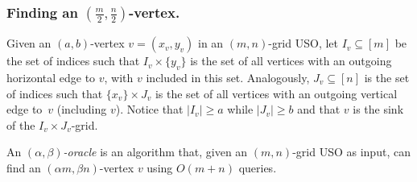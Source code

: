 \documentclass[runningheads,a4paper]{llncs}
\newtheorem{observation}{Observation}
\newcommand{\AT}[1]{\marginpar{\parbox{3.6cm}{{\small {\bf AT:} #1}}}} %
\begin{document}
\vspace{-.2in}\subsubsection{Finding an $(\frac{m}{2}, \frac{n}{2})$-vertex.}

Given an $(a, b)$-vertex $v = (x_v, y_v)$ in an $(m,n)$-grid USO, let $I_v\subseteq [m]$ be the set of indices such that  $I_v \times \{y_v\}$ is the set of all vertices with an outgoing horizontal edge to $v$, with $v$ included in this set. Analogously, $J_v\subseteq [n]$ is the set of indices such that $\{x_v\}\times J_v$ is the set of all vertices with an outgoing vertical edge to~$v$ (including $v$). Notice that $|I_v| \geq a$ while $|J_v| \geq b$ and that $v$ is the sink of the $I_v\times J_v$-grid.



An \emph{$(\alpha, \beta)$-oracle} is an algorithm that, given an $(m, n)$-grid USO as input, can find an $(\alpha m, \beta n)$-vertex $v$ using $O(m + n)$ queries.
\end{document}
